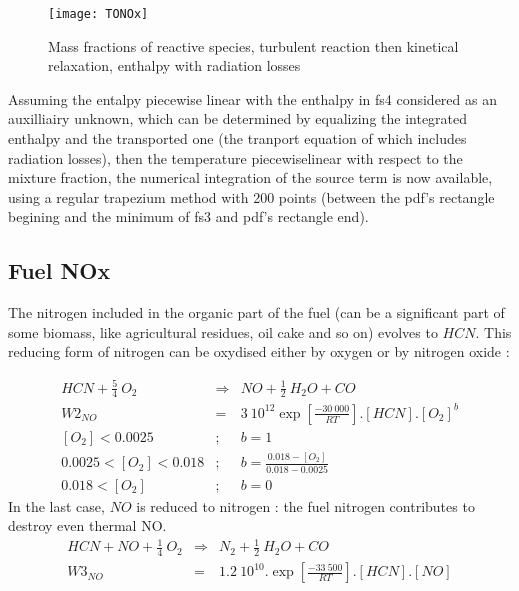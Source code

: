 \begin{figure}[h!]
\centerline{\texttt{[image: TONOx]}}
\caption{Mass fractions of reactive species, turbulent reaction then kinetical relaxation, enthalpy with radiation losses}
\end{figure}

Assuming the entalpy piecewise linear with the enthalpy in fs4 considered as an
auxilliairy unknown, which can be determined by equalizing the integrated
enthalpy and the transported one (the tranport equation of which includes
radiation losses), then the temperature piecewiselinear with respect to the
mixture fraction, the numerical integration of the source term is now available,
using a regular trapezium method with 200 points (between the pdf's rectangle
begining and the minimum of fs3 and pdf's rectangle end).

\subsection {Fuel NOx}
The nitrogen included in the organic part of the fuel (can be a significant part
of some biomass, like agricultural residues, oil cake and so on) evolves to
$HCN$. This reducing form of nitrogen can be oxydised either by oxygen or by
nitrogen oxide :

\begin{eqnarray}
HCN + \frac{5}{4}~ O_{2} &\Rightarrow& NO + \frac{1}{2} ~H_{2}O + CO \nonumber \\
 W2_{NO} &=& 3 \medspace10^{12} \exp \left[\frac{- 30\medspace000}{RT}\right].\left[ HCN \right] . \left[O_{2}\right]^{\textstyle b}\\
\left[O_{2}\right] < 0.0025 &;& b = 1 \nonumber \\
0.0025 < \left[O_{2}\right] < 0.018 &;& b = \frac{0.018-\left[O_{2}\right]}{0.018-0.0025} \nonumber \\
0.018 < \left[O_{2}\right] &;& b = 0 \nonumber
\end{eqnarray}
In the last case, $NO$ is reduced to nitrogen : the fuel nitrogen contributes to destroy even thermal NO.
\begin{eqnarray}
 HCN + NO + \frac{1}{4}~ O_{2} &\Rightarrow& N_{2} + \frac{1}{2}~ H_{2}O + CO \nonumber \\
 W3_{NO} &=& 1.2 \medspace 10^{10}  .  \exp \left[\frac{-33\medspace500}{RT}\right].\left[ HCN \right] . \left[NO\right]
\end{eqnarray} 
\


